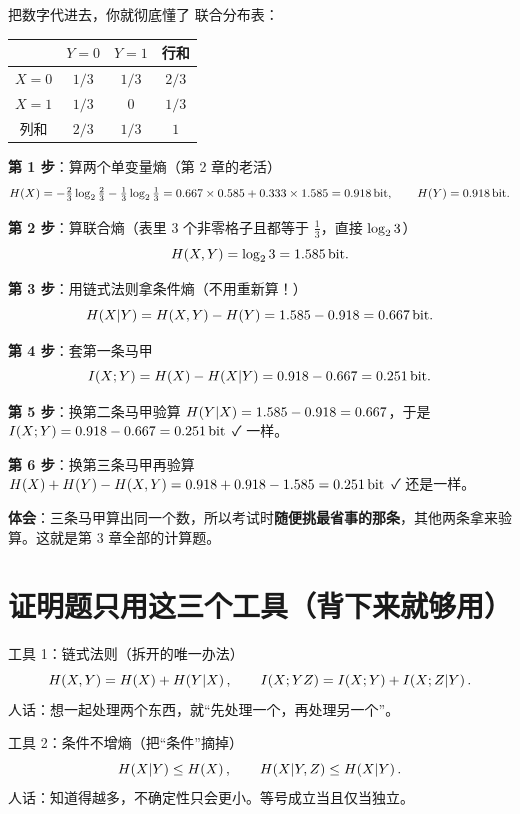 \documentclass[11pt,a4paper]{ctexart}
\begin{document}
\begin{calc}{把数字代进去，你就彻底懂了}
联合分布表：
\begin{center}
\renewcommand{\arraystretch}{1.25}
\begin{tabular}{c|cc|c}
\toprule
 & $Y=0$ & $Y=1$ & 行和\\
\midrule
$X=0$ & $1/3$ & $1/3$ & $2/3$\\
$X=1$ & $1/3$ & $0$ & $1/3$\\
\midrule
列和 & $2/3$ & $1/3$ & $1$\\
\bottomrule
\end{tabular}
\end{center}

\textbf{第 1 步}：算两个单变量熵（第 2 章的老活）
\[
H\!\left(X\right)=-\tfrac23\log_{2}\tfrac23-\tfrac13\log_{2}\tfrac13=0.667\times0.585+0.333\times1.585=0.918\,\text{bit},\qquad H\!\left(Y\right)=0.918\,\text{bit} .
\]

\textbf{第 2 步}：算联合熵（表里 3 个非零格子且都等于 $\frac13$，直接 $\log_{2}3$）
\[
H\!\left(X,Y\right)=\log_{2} 3=1.585\,\text{bit} .
\]

\textbf{第 3 步}：用链式法则拿条件熵（不用重新算！）
\[
H\!\left(X|Y\right)=H\!\left(X,Y\right)-H\!\left(Y\right)=1.585-0.918=0.667\,\text{bit} .
\]

\textbf{第 4 步}：套第一条马甲
\[
I\!\left(X;Y\right)=H\!\left(X\right)-H\!\left(X|Y\right)=0.918-0.667=0.251\,\text{bit} .
\]

\textbf{第 5 步}：换第二条马甲验算
$H\!\left(Y|X\right)=1.585-0.918=0.667$，于是 $I\!\left(X;Y\right)=0.918-0.667=0.251\,\text{bit}$ ✓ 一样。

\textbf{第 6 步}：换第三条马甲再验算
$H\!\left(X\right)+H\!\left(Y\right)-H\!\left(X,Y\right)=0.918+0.918-1.585=0.251\,\text{bit}$ ✓ 还是一样。

\textbf{体会}：三条马甲算出同一个数，所以考试时\textbf{随便挑最省事的那条}，其他两条拿来验算。这就是第 3 章全部的计算题。
\end{calc}

\section{证明题只用这三个工具（背下来就够用）}

\begin{defbox}{工具 1：链式法则（拆开的唯一办法）}
\[
H\!\left(X,Y\right)=H\!\left(X\right)+H\!\left(Y|X\right),\qquad
I\!\left(X;YZ\right)=I\!\left(X;Y\right)+I\!\left(X;Z|Y\right).
\]
人话：想一起处理两个东西，就“先处理一个，再处理另一个”。
\end{defbox}

\begin{defbox}{工具 2：条件不增熵（把“条件”摘掉）}
\[
H\!\left(X|Y\right)\le H\!\left(X\right),\qquad H\!\left(X|Y,Z\right)\le H\!\left(X|Y\right).
\]
人话：知道得越多，不确定性只会更小。等号成立当且仅当独立。
\end{defbox}
\end{document}
